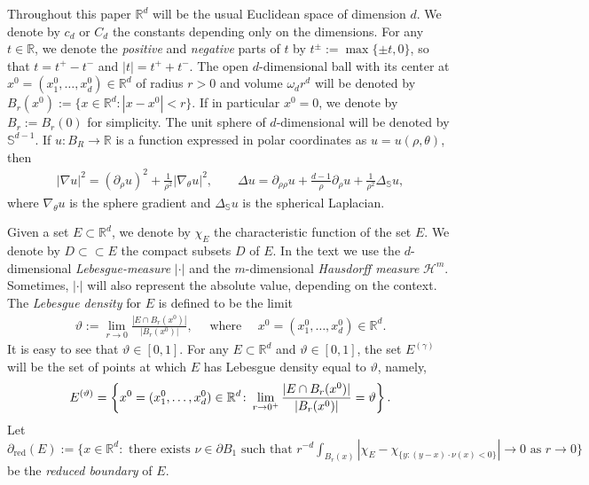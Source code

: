 \documentclass[11pt,reqno]{amsart}
\begin{document}
Throughout this paper $\mathbb{R}^{d}$ will be the usual Euclidean space of dimension $d$. We denote by $c_{d}$ or $C_{d}$ the constants depending only on the dimensions. For any $t\in\mathbb{R}$, we denote the \emph{positive} and \emph{negative} parts of $t$ by $t^{\pm}:=\max\{\pm t,0\}$, so that $t=t^{+}-t^{-}$ and $|t|=t^{+}+t^{-}$. The open $d$-dimensional ball with its center at $x^{0}=(x_{1}^{0},\dots,x_{d}^{0})\in\mathbb{R}^{d}$ of radius $r>0$ and volume $\omega_{d}r^{d}$ will be denoted by $B_{r}(x^{0}):=\{x\in\mathbb{R}^{d}\colon|x-x^{0}|<r\}$. If in particular $x^{0}=0$, we denote by $B_{r}:=B_{r}(0)$ for simplicity. The unit sphere of $d$-dimensional will be denoted by $\mathbb{S}^{d-1}$. If $u\colon B_{R}\to\mathbb{R}$ is a function expressed in polar coordinates as $u=u(\rho,\theta)$, then
\begin{align}\label{Formula: The spherical Laplacian}
    |\nabla u|^{2}=(\partial_{\rho}u)^{2}+\frac{1}{\rho^{2}}|\nabla_{\theta}u|^{2},\qquad\Delta u=\partial_{\rho\rho}u+\frac{d-1}{\rho}\partial_{\rho}u+\frac{1}{\rho^{2}}\Delta_{\mathbb{S}}u,
\end{align}
where $\nabla_{\theta}u$ is the sphere gradient and $\Delta_{\mathbb{S}}u$ is the spherical Laplacian. 

Given a set $E\subset\mathbb{R}^{d}$, we denote by $\chi_{E}$ the characteristic function of the set $E$. We denote by $D\subset\subset E$ the compact subsets $D$ of $E$. In the text we use the $d$-dimensional \emph{Lebesgue-measure} $|\cdot|$ and the $m$-dimensional \emph{Hausdorff measure} $\mathcal{H}^{m}$. Sometimes, $|\cdot|$ will also represent the absolute value, depending on the context. The \emph{Lebesgue density} for $E$ is defined to be the limit
\begin{align*}
	\vartheta:=\lim_{r\to0}\frac{|E\cap B_{r}(x^{0})|}{|B_{r}(x^{0})|},\quad\text{ where }\quad x^{0}=(x_{1}^{0},\ldots,x_{d}^{0})\in\mathbb{R}^{d}.
\end{align*}
It is easy to see that $\vartheta\in[0,1]$. For any $E\subset\mathbb{R}^{d}$ and $\vartheta\in[0,1]$, the set $E^{(\gamma)}$ will be the set of points at which $E$ has Lebesgue density equal to $\vartheta$, namely,
\begin{align}\label{Formula: Definition of E^{gamma}}
	E^{(\vartheta)}=\left\lbrace x^{0}=(x_{1}^{0},\ldots,x_{d}^{0})\in\mathbb{R}^{d}\colon\lim_{r\to0^{+}}\frac{|E\cap B_{r}(x^{0})|}{|B_{r}(x^{0})|}=\vartheta\right\rbrace.
\end{align}
Let $\partial_{\mathrm{red}}(E):=\{ x\in\mathbb{R}^{d}\colon\text{ there exists }\nu\in\partial B_{1}\text{ such that } r^{-d}\int_{B_{r}(x)}|\chi_{E}-\chi_{\{y\colon(y-x)\cdot\nu(x)<0\}}|\to0\text{ as }r\to0\}$ be the \emph{reduced boundary} of $E$.
\end{document}
